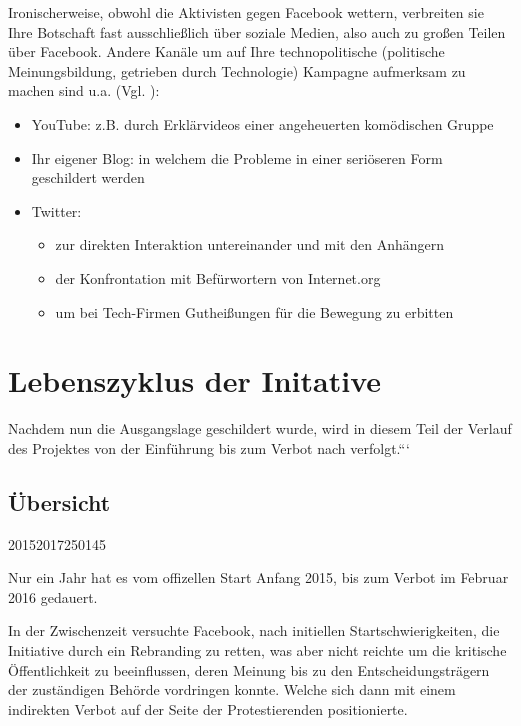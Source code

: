 \documentclass{article}
\begin{document}
\medskip

Ironischerweise, obwohl die Aktivisten gegen Facebook wettern, verbreiten sie Ihre Botschaft fast ausschließlich über soziale Medien, also auch zu großen Teilen über Facebook. Andere Kanäle um auf Ihre technopolitische (politische Meinungsbildung, getrieben durch Technologie) Kampagne aufmerksam zu machen sind u.a. (Vgl. \cite{prasad2017}):
\begin{itemize}
  \item YouTube: z.B. durch Erklärvideos einer angeheuerten komödischen Gruppe
  \item Ihr eigener Blog: in welchem die Probleme in einer seriöseren Form geschildert werden
  \item Twitter:
    \begin{itemize}
      \item zur direkten Interaktion untereinander und mit den Anhängern
      \item der Konfrontation mit Befürwortern von Internet.org
      \item um bei Tech-Firmen Gutheißungen für die Bewegung zu erbitten
    \end{itemize}
\end{itemize}

\section{Lebenszyklus der Initative}

Nachdem nun die Ausgangslage geschildert wurde, wird in diesem Teil der Verlauf des Projektes von der Einführung bis zum Verbot nach verfolgt.```

\subsection{Übersicht}

\begin{timeline}{2015}{2017}{250}{145}
\end{timeline}

Nur ein Jahr hat es vom offizellen Start Anfang 2015, bis zum Verbot im Februar 2016 gedauert.

In der Zwischenzeit versuchte Facebook, nach initiellen Startschwierigkeiten, die Initiative durch ein Rebranding zu retten, was aber nicht reichte um die kritische Öffentlichkeit zu beeinflussen, deren Meinung bis zu den Entscheidungsträgern der zuständigen Behörde vordringen konnte.
Welche sich dann mit einem indirekten Verbot auf der Seite der Protestierenden positionierte.
\end{document}
